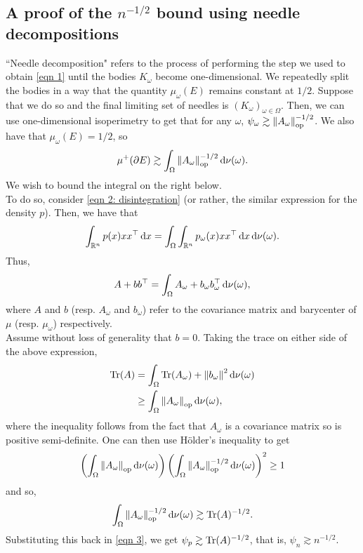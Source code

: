 \documentclass{article}
\begin{document}
\subsection{A proof of the \texorpdfstring{$n^{-1/2}$}{n-12} bound using needle decompositions}

``Needle decomposition" refers to the process of performing the step we used to obtain \eqref{eqn 1} until the bodies $K_\omega$ become one-dimensional. We repeatedly split the bodies in a way that the quantity $\mu_\omega(E)$ remains constant at $1/2$. Suppose that we do so and the final limiting set of needles is $(K_\omega)_{\omega\in\Omega}$. Then, we can use one-dimensional isoperimetry to get that for any $\omega$, $\psi_\omega \gtrsim \left\lVert A_\omega\right\rVert_{\text{op}}^{-1/2}$. We also have that $\mu_\omega(E) = 1/2$, so
\begin{equation}
	\label{eqn 3}
	\mu^+(\partial E) \gtrsim \int_\Omega \left\lVert A_\omega\right\rVert_{\text{op}}^{-1/2} \operatorname{d}\!{\nu}(\omega).
\end{equation}
We wish to bound the integral on the right below.\\

To do so, consider \eqref{eqn 2: disintegration} (or rather, the similar expression for the density $p$). Then, we have that
\[ \int_{\Rn} p(x) xx^\top \dif x = \int_\Omega \int_{\Rn} p_\omega(x) xx^\top \dif x \dif {\nu(\omega)}. \]
Thus,
\begin{equation}
	\label{eqn 5}
	A + bb^\top = \int_\Omega A_\omega + b_\omega b_\omega^\top \operatorname{d}\!{\nu(\omega)},
\end{equation}
where $A$ and $b$ (resp. $A_\omega$ and $b_\omega$) refer to the covariance matrix and barycenter of $\mu$ (resp. $\mu_\omega$) respectively.\\
Assume without loss of generality that $b = 0$. Taking the trace on either side of the above expression,
\begin{align*}
	\operatorname{Tr}(A) &= \int_\Omega \operatorname{Tr}(A_\omega) + \left\lVert b_\omega\right\rVert^2 \operatorname{d}\!{\nu(\omega)} \\
		&\geq \int_\Omega \left\lVert A_\omega\right\rVert_{\text{op}} \operatorname{d}\!{\nu(\omega)},
\end{align*}
where the inequality follows from the fact that $A_\omega$ is a covariance matrix so is positive semi-definite.
One can then use H\"older's inequality to get
\[ \left(\int_\Omega \left\lVert A_\omega\right\rVert_{\text{op}} \operatorname{d}\!{\nu(\omega)} \right) \left( \int_\Omega \left\lVert A_\omega\right\rVert_{\text{op}}^{-1/2} \operatorname{d}\!{\nu(\omega)} \right)^2 \geq 1 \]
and so,
\[ \int_\Omega \left\lVert A_\omega\right\rVert_{\text{op}}^{-1/2} \operatorname{d}\!{\nu(\omega)} \gtrsim \operatorname{Tr}(A)^{-1/2}.  \]
Substituting this back in \eqref{eqn 3}, we get $\psi_p \gtrsim \operatorname{Tr}(A)^{-1/2}$, that is, $\psi_n \gtrsim n^{-1/2}$.
\end{document}
